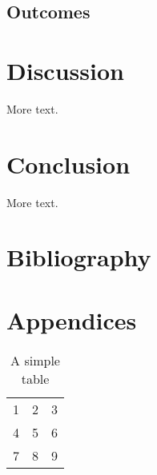 \documentclass[12pt]{article} %
\begin{document}
\subsection{Outcomes}
\pagebreak





\section{Discussion}
More text.
\pagebreak





\section{Conclusion}
More text.
\pagebreak




\section{Bibliography}


\pagebreak





\section{Appendices}


\begin{table}
	\begin{center}
		\begin{tabular}{| l c r|}
		\hline
		1 & 2 & 3 \\
		4 & 5 & 6 \\
		7 & 8 & 9 \\
		\hline
		\end{tabular}
	\end{center}
	\caption{A simple table}
\end{table}
\end{document}
